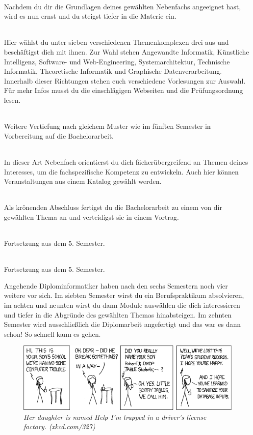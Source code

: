 \textbf{} \\
Nachdem du dir die Grundlagen deines gewählten Nebenfachs angeeignet hast, wird es nun ernst und du steigst tiefer in die Materie ein.

\textbf{} \\
Hier wählst du unter sieben verschiedenen Themenkomplexen drei aus und beschäftigst dich mit ihnen.
Zur Wahl stehen Angewandte Informatik, Künstliche Intelligenz, Software- und Web-Engineering, Systemarchitektur, Technische Informatik, Theoretische Informatik und Graphische Datenverarbeitung.
Innerhalb dieser Richtungen stehen euch verschiedene Vorlesungen zur Auswahl.
Für mehr Infos musst du die einschlägigen Webseiten und die Prüfungsordnung lesen.



\textbf{} \\
Weitere Vertiefung nach gleichem Muster wie im fünften Semester in Vorbereitung auf die Bachelorarbeit.

\textbf{} \\
In dieser Art Nebenfach orientierst du dich fächerübergreifend an Themen deines Interesses, um die fachspezifische Kompetenz zu entwickeln.
Auch hier können Veranstaltungen aus einem Katalog gewählt werden.

\textbf{} \\
Als krönenden Abschluss fertigst du die Bachelorarbeit zu einem von dir gewählten Thema an und verteidigst sie in einem Vortrag.

\textbf{} \\
Fortsetzung aus dem 5. Semester.

\textbf{} \\
Fortsetzung aus dem 5. Semester.


Angehende Diplominformatiker haben nach den sechs Semestern noch vier weitere vor sich.
Im siebten Semester wirst du ein Berufspraktikum absolvieren, im achten und neunten wirst du dann Module auswählen die dich interessieren und tiefer in die Abgründe des gewählten Themas hinabsteigen.
Im zehnten Semester wird ausschließlich die Diplomarbeit angefertigt und das war es dann schon!
So schnell kann es gehen.

\vfill

\begin{figure}[h!]
\centering
\includegraphics[scale=.5]{img/xkcd/exploits_of_a_mom.png}
\caption*{{\small \textit{Her daughter is named Help I'm trapped in a driver's license factory. (xkcd.com/327)}}}
\end{figure}
